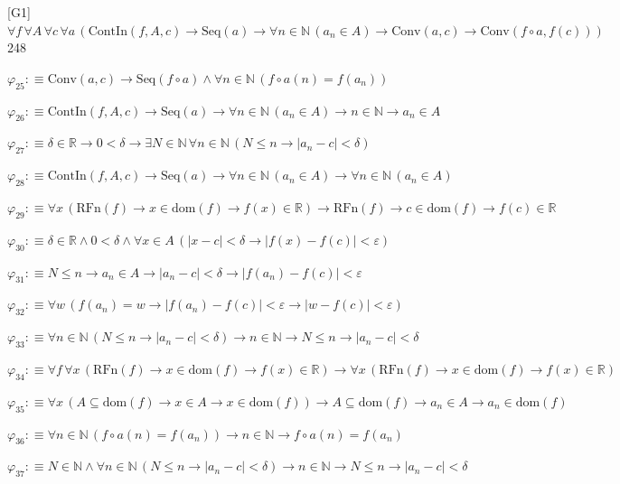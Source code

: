 \begin{fullproof}{[G1]}{$\forall f\,\forall A\,\forall c\,\forall a\,(\mathrm{ContIn}(f,A,c) \to \mathrm{Seq}(a) \to \forall n \in \mathbb{N}\,(a_{n} \in A) \to \mathrm{Conv}(a,c) \to \mathrm{Conv}(f \circ a,f(c)))$}{248}
\begin{abbrevlist}
\item $\varphi_{25} :\equiv \mathrm{Conv}(a,c) \to \mathrm{Seq}(f \circ a) \land \forall n \in \mathbb{N}\,(f \circ a(n) = f(a_{n}))$
\item $\varphi_{26} :\equiv \mathrm{ContIn}(f,A,c) \to \mathrm{Seq}(a) \to \forall n \in \mathbb{N}\,(a_{n} \in A) \to n \in \mathbb{N} \to a_{n} \in A$
\item $\varphi_{27} :\equiv \delta \in \mathbb{R} \to 0 < \delta \to \exists N \in \mathbb{N}\,\forall n \in \mathbb{N}\,(N \leq n \to \lvert a_{n} - c \rvert < \delta)$
\item $\varphi_{28} :\equiv \mathrm{ContIn}(f,A,c) \to \mathrm{Seq}(a) \to \forall n \in \mathbb{N}\,(a_{n} \in A) \to \forall n \in \mathbb{N}\,(a_{n} \in A)$
\item $\varphi_{29} :\equiv \forall x\,(\mathrm{RFn}(f) \to x \in \mathrm{dom}(f) \to f(x) \in \mathbb{R}) \to \mathrm{RFn}(f) \to c \in \mathrm{dom}(f) \to f(c) \in \mathbb{R}$
\item $\varphi_{30} :\equiv \delta \in \mathbb{R} \land 0 < \delta \land \forall x \in A\,(\lvert x - c \rvert < \delta \to \lvert f(x) - f(c) \rvert < \varepsilon)$
\item $\varphi_{31} :\equiv N \leq n \to a_{n} \in A \to \lvert a_{n} - c \rvert < \delta \to \lvert f(a_{n}) - f(c) \rvert < \varepsilon$
\item $\varphi_{32} :\equiv \forall w\,(f(a_{n}) = w \to \lvert f(a_{n}) - f(c) \rvert < \varepsilon \to \lvert w - f(c) \rvert < \varepsilon)$
\item $\varphi_{33} :\equiv \forall n \in \mathbb{N}\,(N \leq n \to \lvert a_{n} - c \rvert < \delta) \to n \in \mathbb{N} \to N \leq n \to \lvert a_{n} - c \rvert < \delta$
\item $\varphi_{34} :\equiv \forall f\,\forall x\,(\mathrm{RFn}(f) \to x \in \mathrm{dom}(f) \to f(x) \in \mathbb{R}) \to \forall x\,(\mathrm{RFn}(f) \to x \in \mathrm{dom}(f) \to f(x) \in \mathbb{R})$
\item $\varphi_{35} :\equiv \forall x\,(A \subseteq \mathrm{dom}(f) \to x \in A \to x \in \mathrm{dom}(f)) \to A \subseteq \mathrm{dom}(f) \to a_{n} \in A \to a_{n} \in \mathrm{dom}(f)$
\item $\varphi_{36} :\equiv \forall n \in \mathbb{N}\,(f \circ a(n) = f(a_{n})) \to n \in \mathbb{N} \to f \circ a(n) = f(a_{n})$
\item $\varphi_{37} :\equiv N \in \mathbb{N} \land \forall n \in \mathbb{N}\,(N \leq n \to \lvert a_{n} - c \rvert < \delta) \to n \in \mathbb{N} \to N \leq n \to \lvert a_{n} - c \rvert < \delta$

\end{abbrevlist}
\end{fullproof}
